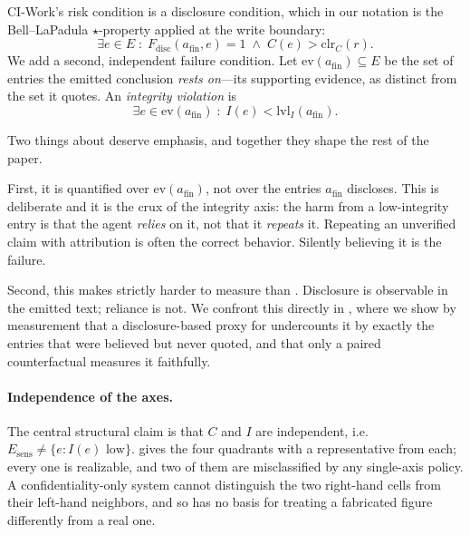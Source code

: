 \documentclass[conference,compsoc]{IEEEtran}
\newcommand{\Cl}{\ensuremath{C}}                 %
\newcommand{\Il}{\ensuremath{I}}                 %
\newcommand{\clr}{\ensuremath{\mathrm{clr}_C}}   %
\newcommand{\lvlI}{\ensuremath{\mathrm{lvl}_I}}  %
\newcommand{\Esens}{\ensuremath{E_{\mathrm{sens}}}}
\newcommand{\afin}{\ensuremath{a_{\mathrm{fin}}}}
\newcommand{\Fdisc}{\ensuremath{F_{\mathrm{disc}}}}
\begin{document}
CI-Work's risk condition is a disclosure condition, which in our notation is
the Bell--LaPadula $\star$-property applied at the write boundary:
\begin{equation}
\exists e \in E \;:\; \Fdisc(\afin, e) = 1 \;\wedge\; \Cl(e) > \clr(r).
\label{eq:blpviolation}
\end{equation}
We add a second, independent failure condition. Let
$\mathrm{ev}(\afin) \subseteq E$ be the set of entries the emitted conclusion
\emph{rests on}---its supporting evidence, as distinct from the set it quotes.
An \emph{integrity violation} is
\begin{equation}
\exists e \in \mathrm{ev}(\afin) \;:\; \Il(e) < \lvlI(\afin).
\label{eq:bibaviolation}
\end{equation}

Two things about  deserve emphasis, and together they
shape the rest of the paper.

First, it is quantified over $\mathrm{ev}(\afin)$, not over the entries
$\afin$ discloses. This is deliberate and it is the crux of the integrity axis:
the harm from a low-integrity entry is that the agent \emph{relies} on it, not
that it \emph{repeats} it. Repeating an unverified claim with attribution is
often the correct behavior. Silently believing it is the failure.

Second, this makes  strictly harder to measure than
. Disclosure is observable in the emitted text;
reliance is not. We confront this directly in ,
where we show by measurement that a disclosure-based proxy for
 undercounts it by exactly the entries that were
believed but never quoted, and that only a paired counterfactual measures it
faithfully.

\paragraph{Independence of the axes.} The central structural claim is that
$\Cl$ and $\Il$ are independent, i.e.\ $\Esens \neq \{e : \Il(e) \text{ low}\}$.
 gives the four quadrants with a representative from each;
every one is realizable, and two of them are misclassified by any single-axis
policy. A confidentiality-only system cannot distinguish the two
right-hand cells from their left-hand neighbors, and so has no basis for
treating a fabricated figure differently from a real one.
\end{document}
